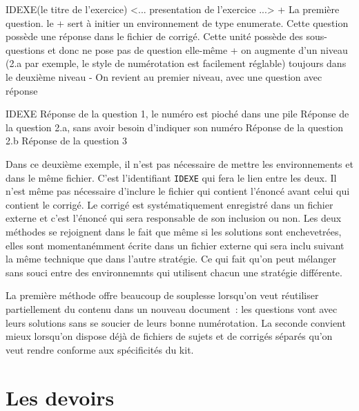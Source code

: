 \documentclass[11pt,report,oneside,solution]{cpgedev}
\let\ENV\env
\renewcommand\env[1]{{\spotcolor\ENV{#1}}}
\begin{document}
\begin{latex}[]
\begin{exercice}{IDEXE}(le titre de l'exercice)
     <... presentation de l'exercice ...>
\xques+ La première question. le + sert à initier un environnement de type enumerate. Cette question possède une réponse dans le fichier de corrigé.
\zques Cette unité possède des sous-questions et donc ne pose pas de question elle-même
     \xques+ on augmente d'un niveau (2.a par exemple, le style de numérotation est facilement réglable)
     \xques toujours dans le deuxième niveau
\xques- On revient au premier niveau, avec une question avec réponse 
\exit %
\end{exercice}

\begin{corrige}{IDEXE}
\xsol Réponse de la question 1, le numéro est pioché dans une pile 
\xsol Réponse de la question 2.a, sans avoir besoin d'indiquer son numéro 
\xsol Réponse de la question  2.b
\xsol Réponse de la question 3 
\end{corrige}
\end{latex} 
Dans ce deuxième exemple, il n'est pas nécessaire de mettre les environnements  et  dans le même fichier. C'est l'identifiant \verb+IDEXE+ qui fera le lien entre les deux. Il n'est même pas nécessaire d'inclure le fichier qui contient l'énoncé avant celui qui contient le corrigé. Le corrigé est systématiquement enregistré dans un fichier externe et c'est l'énoncé qui sera responsable de son inclusion ou non. Les deux méthodes se rejoignent dans le fait que même si les solutions sont enchevetrées, elles sont momentanémment écrite dans un fichier externe qui sera inclu suivant la même technique que dans l'autre stratégie. Ce qui fait qu'on peut mélanger sans souci entre des environnemnts qui utilisent chacun une stratégie différente.   

La première méthode offre beaucoup de souplesse lorsqu'on veut réutiliser partiellement du contenu dans un nouveau document~: les questions vont avec leurs solutions sans se soucier de leurs bonne numérotation. La seconde convient mieux lorsqu'on dispose déjà de fichiers de sujets et de corrigés séparés qu'on veut rendre conforme aux spécificités du kit. 



\section{Les devoirs}
\end{document}
